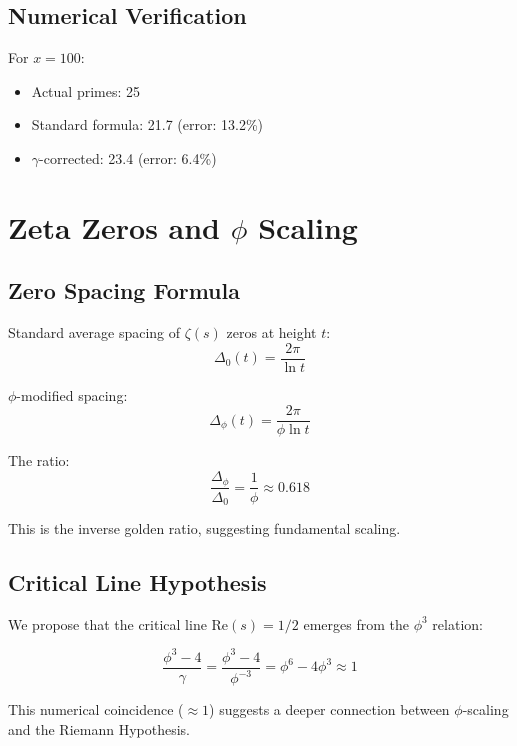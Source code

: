 \documentclass[12pt,a4paper]{article}
\begin{document}
\subsection{Numerical Verification}

For $x = 100$:
\begin{itemize}
\item Actual primes: 25
\item Standard formula: 21.7 (error: 13.2\%)
\item $\gamma$-corrected: 23.4 (error: 6.4\%)
\end{itemize}

\section{Zeta Zeros and $\phi$ Scaling}

\subsection{Zero Spacing Formula}

Standard average spacing of $\zeta(s)$ zeros at height $t$:
\begin{equation}
\Delta_0(t) = \frac{2\pi}{\ln t}
\end{equation}

$\phi$-modified spacing:
\begin{equation}
\Delta_\phi(t) = \frac{2\pi}{\phi \ln t}
\end{equation}

The ratio:
\begin{equation}
\frac{\Delta_\phi}{\Delta_0} = \frac{1}{\phi} \approx 0.618
\end{equation}

This is the inverse golden ratio, suggesting fundamental scaling.

\subsection{Critical Line Hypothesis}

We propose that the critical line $\text{Re}(s) = 1/2$ emerges from the $\phi^3$ relation:

\begin{equation}
\frac{\phi^3 - 4}{\gamma} = \frac{\phi^3 - 4}{\phi^{-3}} = \phi^6 - 4\phi^3 \approx 1
\end{equation}

This numerical coincidence ($\approx 1$) suggests a deeper connection between $\phi$-scaling and the Riemann Hypothesis.
\end{document}
